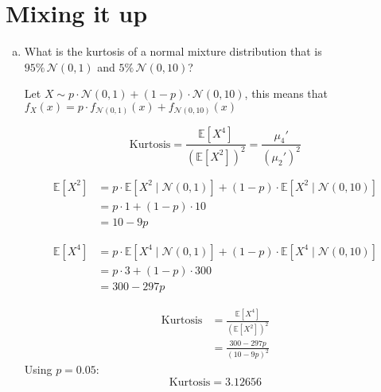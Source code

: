 \documentclass{article}
\begin{document}
\section{Mixing it up}
\begin{enumerate}[(a)]
    \item What is the kurtosis of a normal mixture distribution that is\\
          $95\%\, \mathcal{N}(0,1)$ and $5\%\, \mathcal{N}(0,10)$?

          Let \( X \sim p \cdot \mathcal{N}(0, 1) + (1 - p) \cdot \mathcal{N}(0, 10) \),
          this means that $f_X(x) = p\cdot f_{\mathcal{N}(0, 1)}(x) + f_{\mathcal{N}(0, 10)}(x)$

          \[
              \text{Kurtosis} = \frac{\mathbb{E}[X^4]}{(\mathbb{E}[X^2])^2}
              = \frac{\mu_4'}{(\mu_2')^2}
          \]

          \[
              \begin{aligned}
                  \mathbb{E}[X^2]
                   & = p \cdot \mathbb{E}[X^2 \mid \mathcal{N}(0,1)]
                  + (1 - p) \cdot \mathbb{E}[X^2 \mid \mathcal{N}(0,10)] \\
                   & = p \cdot 1 + (1 - p) \cdot 10                      \\
                   & = 10 - 9p
              \end{aligned}
          \]

          \[
              \begin{aligned}
                  \mathbb{E}[X^4]
                   & = p \cdot \mathbb{E}[X^4 \mid \mathcal{N}(0,1)]
                  + (1 - p) \cdot \mathbb{E}[X^4 \mid \mathcal{N}(0,10)] \\
                   & = p \cdot 3 + (1 - p) \cdot 300                     \\
                   & = 300 - 297p
              \end{aligned}
          \]

          \[
              \begin{aligned}
                  \text{Kurtosis}
                   & = \frac{\mathbb{E}[X^4]}{(\mathbb{E}[X^2])^2} \\
                   & = \frac{300 - 297p}{(10 - 9p)^2}
              \end{aligned}
          \]
          Using $p=0.05$:
          \[
              \boxed{
                  \text{Kurtosis} = 3.12656
              }
          \]



\end{enumerate}
\end{document}
